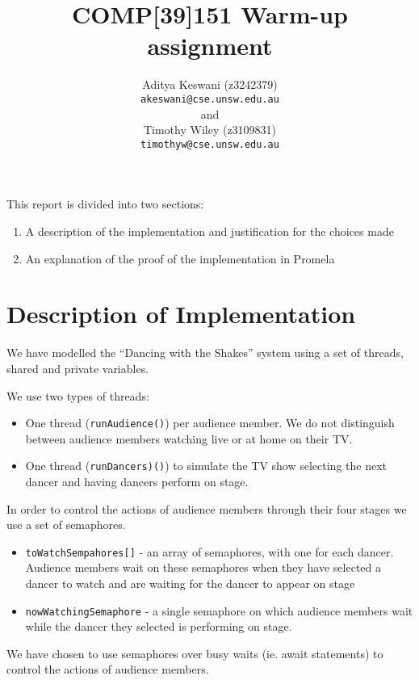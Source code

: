 \documentclass[12pt,a4paper]{scrartcl}
\begin{document}
\title{COMP[39]151 Warm-up assignment}
\author{Aditya Keswani (z3242379) \\ 
        \texttt{akeswani@cse.unsw.edu.au} \\ 
        and \\ 
        Timothy Wiley (z3109831) \\
        \texttt{timothyw@cse.unsw.edu.au} }

\maketitle

This report is divided into two sections:
\begin{enumerate}
    \item A description of the implementation and justification for the choices made
    \item An explanation of the proof of the implementation in Promela
\end{enumerate}

\section{Description of Implementation}
We have modelled the ``Dancing with the Shakes'' system using a set of threads, shared and private variables.

We use two types of threads:
\begin{itemize}
    \item One thread (\texttt{runAudience()}) per audience member. We do not distinguish between audience members watching live or at home on their TV.
    \item One thread (\texttt{runDancers)()}) to simulate the TV show selecting the next dancer and having dancers perform on stage.
\end{itemize}

In order to control the actions of audience members through their four stages we use a set of semaphores.
\begin{itemize}
    \item \texttt{toWatchSempahores[]} - an array of semaphores, with one for each dancer.
          Audience members wait on these semaphores when they have selected a dancer to watch and are waiting for the dancer to appear on stage
    \item \texttt{nowWatchingSemaphore} - a single semaphore on which audience members wait while the dancer they selected is performing on stage.
\end{itemize}
We have chosen to use semaphores over busy waits (ie. await statements) to control the actions of audience members.
\end{document}

